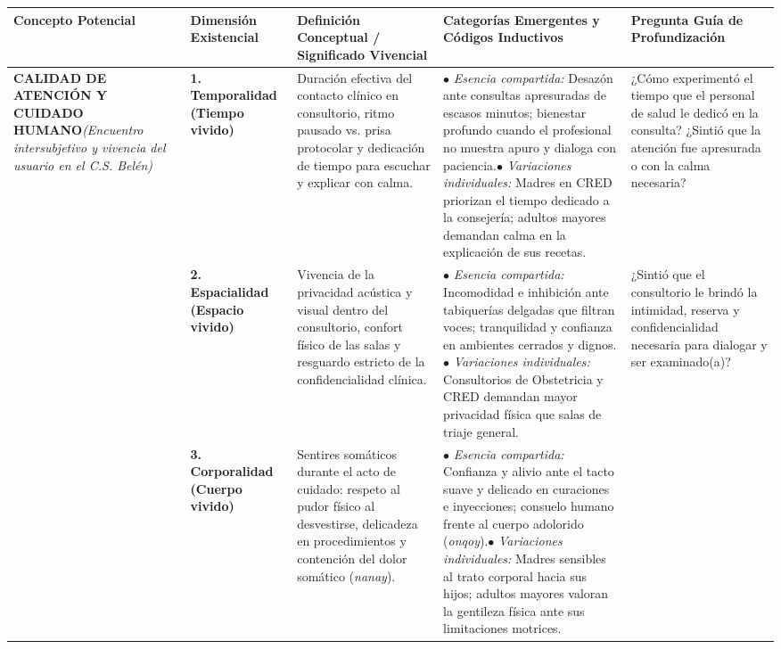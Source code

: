 \begin{table}[H]
\centering
\scriptsize
\begin{tabularx}{\textwidth}{p{2.3cm}p{2.5cm}p{3.2cm}p{3.8cm}X}
\toprule
\textbf{Concepto Potencial} & \textbf{Dimensión Existencial} & \textbf{Definición Conceptual / Significado Vivencial} & \textbf{Categorías Emergentes y Códigos Inductivos} & \textbf{Pregunta Guía de Profundización} \\
\midrule
\multirow{5}{=}{\textbf{CALIDAD DE ATENCIÓN Y CUIDADO HUMANO}\newline\newline \textit{(Encuentro intersubjetivo y vivencia del usuario en el C.S. Belén)}} 
& \textbf{1. Temporalidad (Tiempo vivido)} 
& Duración efectiva del contacto clínico en consultorio, ritmo pausado vs. prisa protocolar y dedicación de tiempo para escuchar y explicar con calma. 
& $\bullet$ \textit{Esencia compartida:} Desazón ante consultas apresuradas de escasos minutos; bienestar profundo cuando el profesional no muestra apuro y dialoga con paciencia.\newline $\bullet$ \textit{Variaciones individuales:} Madres en CRED priorizan el tiempo dedicado a la consejería; adultos mayores demandan calma en la explicación de sus recetas. 
& ¿Cómo experimentó el tiempo que el personal de salud le dedicó en la consulta? ¿Sintió que la atención fue apresurada o con la calma necesaria? \\
\cmidrule{2-5}
& \textbf{2. Espacialidad (Espacio vivido)} 
& Vivencia de la privacidad acústica y visual dentro del consultorio, confort físico de las salas y resguardo estricto de la confidencialidad clínica. 
& $\bullet$ \textit{Esencia compartida:} Incomodidad e inhibición ante tabiquerías delgadas que filtran voces; tranquilidad y confianza en ambientes cerrados y dignos.\newline $\bullet$ \textit{Variaciones individuales:} Consultorios de Obstetricia y CRED demandan mayor privacidad física que salas de triaje general. 
& ¿Sintió que el consultorio le brindó la intimidad, reserva y confidencialidad necesaria para dialogar y ser examinado(a)? \\
\cmidrule{2-5}
& \textbf{3. Corporalidad (Cuerpo vivido)} 
& Sentires somáticos durante el acto de cuidado: respeto al pudor físico al desvestirse, delicadeza en procedimientos y contención del dolor somático (\textit{nanay}). 
& $\bullet$ \textit{Esencia compartida:} Confianza y alivio ante el tacto suave y delicado en curaciones e inyecciones; consuelo humano frente al cuerpo adolorido (\textit{onqoy}).\newline $\bullet$ \textit{Variaciones individuales:} Madres sensibles al trato corporal hacia sus hijos; adultos mayores valoran la gentileza física ante sus limitaciones motrices. 

\end{tabularx}
\end{table}
